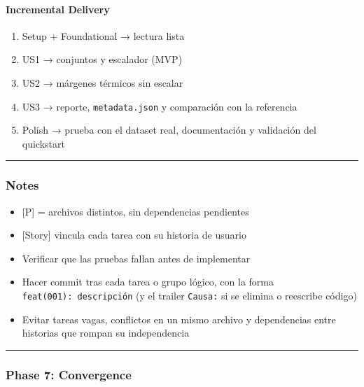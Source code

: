 \documentclass[12pt,a4paper]{article}
\providecommand{\tightlist}{\setlength{\itemsep}{0pt}\setlength{\parskip}{0pt}}
\newenvironment{documentogenerado}[2]{%
  \def\doccomando{#1}\def\docruta{#2}%
  \par\begingroup\small\setstretch{1.15}\sloppy%
}{\endgroup\par\medskip}
\begin{document}
\begin{documentogenerado}{/speckit-tasks (fase 7: /speckit-converge)}{specs\slash 001-preparacion-datos\slash tasks.md}
\paragraph{Incremental Delivery}

\begin{enumerate}
\def\labelenumi{\arabic{enumi}.}
\tightlist
\item
  Setup + Foundational → lectura lista
\item
  US1 → conjuntos y escalador (MVP)
\item
  US2 → márgenes térmicos sin escalar
\item
  US3 → reporte, \texttt{metadata.\allowbreak{}json} y comparación con la referencia
\item
  Polish → prueba con el dataset real, documentación y validación del quickstart
\end{enumerate}

\begin{center}\rule{0.5\linewidth}{0.5pt}\end{center}

\subsubsection{Notes}

\begin{itemize}
\tightlist
\item
  {[}P{]} = archivos distintos, sin dependencias pendientes
\item
  {[}Story{]} vincula cada tarea con su historia de usuario
\item
  Verificar que las pruebas fallan antes de implementar
\item
  Hacer commit tras cada tarea o grupo lógico, con la forma \texttt{feat(001):\ descripción} (y el trailer \texttt{Causa:} si se elimina o reescribe código)
\item
  Evitar tareas vagas, conflictos en un mismo archivo y dependencias entre historias que rompan su independencia
\end{itemize}

\begin{center}\rule{0.5\linewidth}{0.5pt}\end{center}

\subsubsection{Phase 7: Convergence}


\end{documentogenerado}
\end{document}
